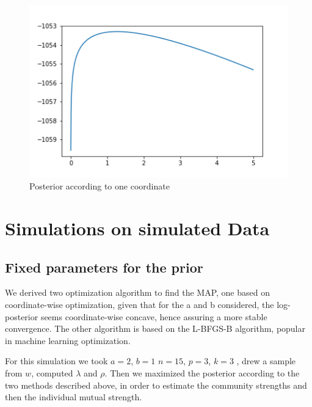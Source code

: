\documentclass[12pt]{ociamthesis}  %
\begin{document}
	\begin{figure}
		\centering
		\includegraphics[width=\textwidth,height=\textheight,keepaspectratio]{CoordinateWiseFunction}
		\caption{Posterior according to one coordinate}
	\end{figure}
	
	\section{Simulations on simulated Data}
	\subsection{Fixed parameters for the prior}
	We derived two optimization algorithm to find the MAP, one based on coordinate-wise optimization, given that for the a and b considered, the log-posterior seems coordinate-wise concave, hence assuring a more stable convergence. The other algorithm is based on the L-BFGS-B algorithm, popular in machine learning optimization.
	
	For this simulation we took $a = 2$, $b = 1$ $n = 15$, $p = 3$, $k = 3$ , drew a sample from $w$, computed $\lambda$ and $\rho$. Then we maximized the posterior according to the two methods described above, in order to estimate the community strengths and then the individual mutual strength. 

\end{document}
